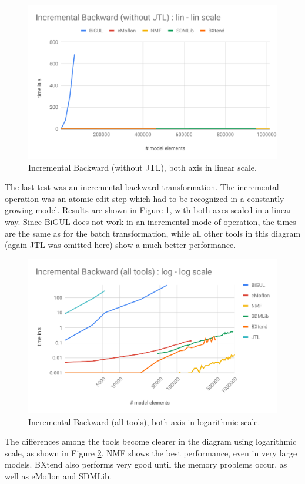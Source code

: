 \begin{figure}[h!]
	\centering
	\includegraphics[width=\columnwidth]{diagrams/scalability/IBlinlin}
	\caption{Incremental Backward (without JTL), both axis in linear scale.}
	\label{fig:scalabilityIncrBWDlin}
\end{figure}

The last test was an incremental backward transformation. The incremental operation was an atomic edit step which had to be recognized in a constantly growing model. Results are shown in Figure \ref{fig:scalabilityIncrBWDlin}, with both axes scaled in a linear way. Since BiGUL does not work in an incremental mode of operation, the times are the same as for the batch transformation, while all other tools in this diagram (again JTL was omitted here) show a much better performance.

\begin{figure}[h!]
	\centering
	\includegraphics[width=\columnwidth]{diagrams/scalability/IBloglog}
	\caption{Incremental Backward (all tools), both axis in logarithmic scale.}
	\label{fig:scalabilityIncrBWDlog}
\end{figure}

The differences among the tools become clearer in the diagram using logarithmic scale, as shown in Figure \ref{fig:scalabilityIncrBWDlog}. NMF shows the best performance, even in very large models. BXtend also performs very good until the memory problems occur, as well as eMoflon and SDMLib.